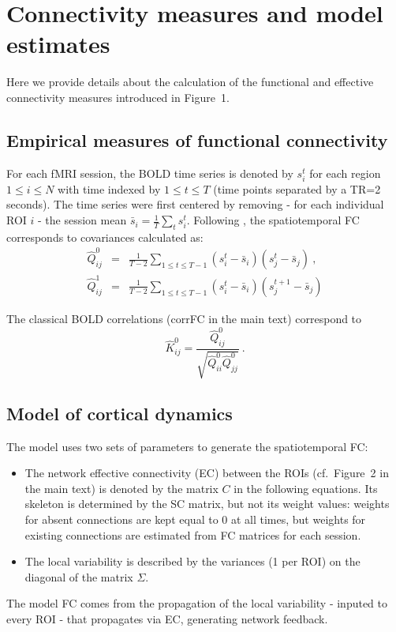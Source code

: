 \documentclass{article}
\begin{document}
\section{Connectivity measures and model estimates}

Here we provide details about the calculation of the functional and effective connectivity measures introduced in Figure~1.

\subsection{Empirical measures of functional connectivity}

For each fMRI session, the BOLD time series is denoted by $s_i^t$ for each region $1 \leq i \leq N$ with time indexed by $1 \leq t \leq T$ (time points separated by a TR=2 seconds). 
The time series were first centered by removing - for each individual ROI $i$ - the session mean $\bar{s}_i = \frac{1}{T} \sum_t s_i^t$. 
Following \cite{Gilson_PCB_2016}, the spatiotemporal FC corresponds to covariances calculated as:
\begin{eqnarray} \label{eq_emp_cov}
\widehat{Q}^0_{ij} & = & \frac{1}{T-2} \sum_{1 \leq t \leq T-1} (s_i^t - \bar{s}_i) (s_j^t - \bar{s}_j)
\ ,
\\
\widehat{Q}^1_{ij} & = & \frac{1}{T-2} \sum_{1 \leq t \leq T-1} (s_i^t - \bar{s}_i) (s_j^{t+1} - \bar{s}_j)
\nonumber
\end{eqnarray}

The classical BOLD correlations (corrFC in the main text) correspond to 
\begin{equation} \label{eq_emp_corr}
\widehat{K}^0_{ij} = \frac{\widehat{Q}^0_{ij}}{\sqrt{\widehat{Q}^0_{ii} \widehat{Q}^0_{jj}}}
\ .
\end{equation}

\subsection{Model of cortical dynamics}

The model uses two sets of parameters to generate the spatiotemporal FC:
\begin{itemize}
\item The network effective connectivity (EC) between the ROIs (cf.\ Figure~2 in the main text) is denoted by the matrix $C$ in the following equations. Its skeleton is determined by the SC matrix, but not its weight values: weights for absent connections are kept equal to 0 at all times, but weights for existing connections are estimated from FC matrices for each session.
\item The local variability is described by the variances (1 per ROI) on the diagonal of the matrix $\Sigma$.
\end{itemize}
The model FC comes from the propagation of the local variability - inputed to every ROI - that propagates via EC, generating network feedback.
\end{document}
